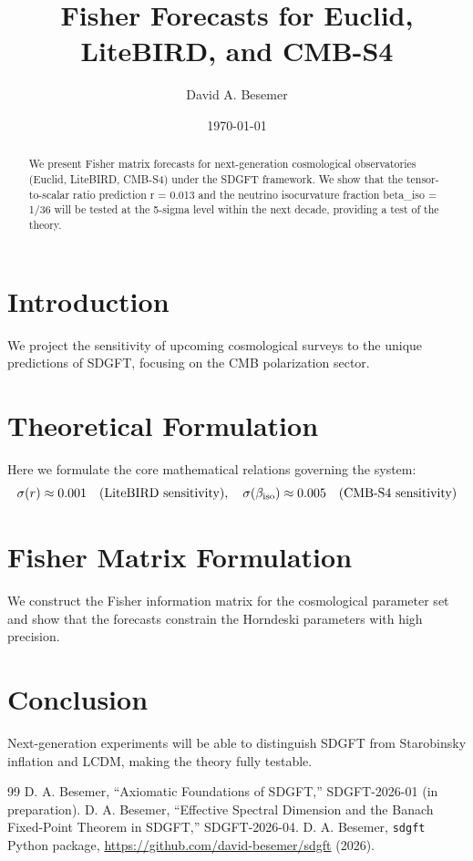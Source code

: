 \documentclass[amsmath,amssymb,aps,prd,twocolumn,superscriptaddress,nofootinbib]{revtex4-2}
\begin{document}

\title{Fisher Forecasts for Euclid, LiteBIRD, and CMB-S4}

\author{David A. Besemer}

\date{\today}

\begin{abstract}
We present Fisher matrix forecasts for next-generation cosmological observatories (Euclid, LiteBIRD, CMB-S4) under the SDGFT framework. We show that the tensor-to-scalar ratio prediction r = 0.013 and the neutrino isocurvature fraction beta_iso = 1/36 will be tested at the 5-sigma level within the next decade, providing a test of the theory.
\end{abstract}

\maketitle

\section{Introduction}
We project the sensitivity of upcoming cosmological surveys to the unique predictions of SDGFT, focusing on the CMB polarization sector.

\section{Theoretical Formulation}
Here we formulate the core mathematical relations governing the system:
\begin{equation}
  \sigma(r) \approx 0.001 \quad (\text{LiteBIRD sensitivity}), \quad \sigma(\beta_{\mathrm{iso}}) \approx 0.005 \quad (\text{CMB-S4 sensitivity})
\end{equation}
\section{Fisher Matrix Formulation}
We construct the Fisher information matrix for the cosmological parameter set and show that the forecasts constrain the Horndeski parameters with high precision.

\section{Conclusion}
Next-generation experiments will be able to distinguish SDGFT from Starobinsky inflation and LCDM, making the theory fully testable.



\begin{thebibliography}{99}
 D. A. Besemer, ``Axiomatic Foundations of SDGFT,'' SDGFT-2026-01 (in preparation).
 D. A. Besemer, ``Effective Spectral Dimension and the Banach Fixed-Point Theorem in SDGFT,'' SDGFT-2026-04.
 D. A. Besemer, \texttt{sdgft} Python package, \url{https://github.com/david-besemer/sdgft} (2026).
\end{thebibliography}
\end{document}
